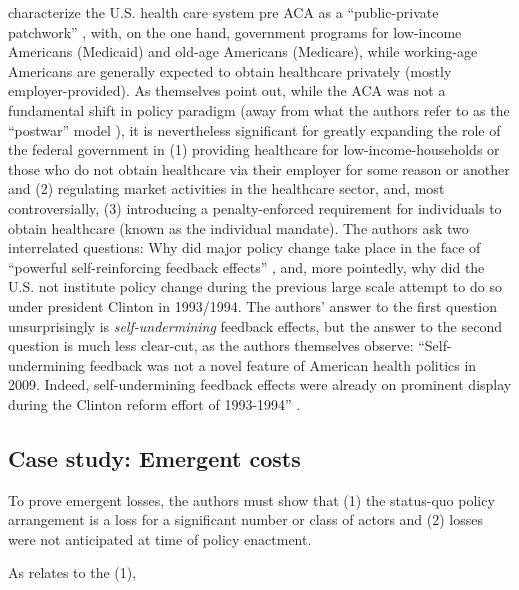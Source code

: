 \documentclass[11pt]{article}
\begin{document}
\textcite[][]{Jacobs2014} characterize the U.S. health care system pre ACA as a \enquote{public-private patchwork} , with, on the one hand, government programs for low-income Americans (Medicaid) and old-age Americans (Medicare), while working-age Americans are generally expected to obtain healthcare privately (mostly employer-provided). As \textcite[][]{Jacobs2014} themselves point out, while the ACA was not a fundamental shift in policy paradigm (away from what the authors refer to as the \enquote{postwar} model ), it is nevertheless significant for greatly expanding the role of the federal government in (1) providing healthcare for low-income-households or those who do not obtain healthcare via their employer for some reason or another and (2) regulating market activities in the healthcare sector, and, most controversially, (3) introducing a penalty-enforced requirement for individuals to obtain healthcare (known as the individual mandate). The authors ask two interrelated questions: Why did major policy change take place in the face of \enquote{powerful self-reinforcing feedback effects} \parencite[][p. 451]{Jacobs2014}, and, more pointedly, why did the U.S. not institute policy change during the previous large scale attempt to do so under president Clinton in 1993/1994. The authors' answer to the first question unsurprisingly is \textit{self-undermining} feedback effects, but the answer to the second question is much less clear-cut, as the authors themselves observe: \enquote{Self-undermining feedback was not a novel feature of American health politics in 2009. Indeed, self-undermining feedback effects were already on prominent display during the Clinton reform effort of 1993-1994} \parencite[][p. 451]{Jacobs2014}.

\subsection*{Case study: Emergent costs}

To prove emergent losses, the authors must show that (1) the status-quo policy arrangement is a loss for a significant number or class of actors and (2) losses were not anticipated at time of policy enactment.

\begin{figure}[H]
  \sffamily
  
  \label{fig:eci}
\end{figure}

As relates to the (1),
\end{document}
